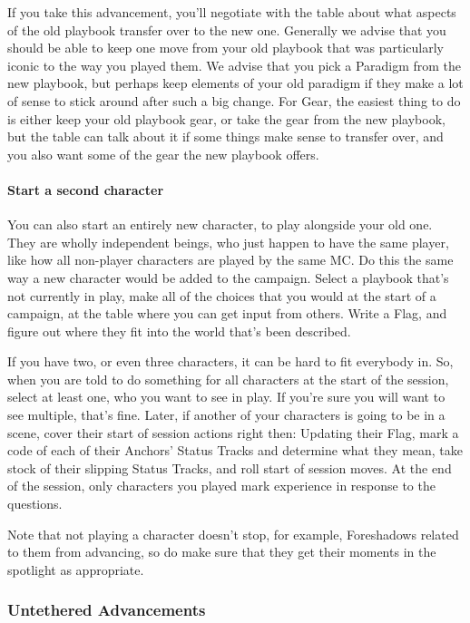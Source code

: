 \documentclass[
]{article}
\begin{document}
If you take this advancement, you'll negotiate with the table about what
aspects of the old playbook transfer over to the new one. Generally we
advise that you should be able to keep one move from your old playbook
that was particularly iconic to the way you played them. We advise that
you pick a Paradigm from the new playbook, but perhaps keep elements of
your old paradigm if they make a lot of sense to stick around after such
a big change. For Gear, the easiest thing to do is either keep your old
playbook gear, or take the gear from the new playbook, but the table can
talk about it if some things make sense to transfer over, and you also
want some of the gear the new playbook offers.

\hypertarget{start-a-second-character}{%
\paragraph{Start a second character}\label{start-a-second-character}}

You can also start an entirely new character, to play alongside your old
one. They are wholly independent beings, who just happen to have the
same player, like how all non-player characters are played by the same
MC. Do this the same way a new character would be added to the campaign.
Select a playbook that's not currently in play, make all of the choices
that you would at the start of a campaign, at the table where you can
get input from others. Write a Flag, and figure out where they fit into
the world that's been described.

If you have two, or even three characters, it can be hard to fit
everybody in. So, when you are told to do something for all characters
at the start of the session, select at least one, who you want to see in
play. If you're sure you will want to see multiple, that's fine. Later,
if another of your characters is going to be in a scene, cover their
start of session actions right then: Updating their Flag, mark a code of
each of their Anchors' Status Tracks and determine what they mean, take
stock of their slipping Status Tracks, and roll start of session moves.
At the end of the session, only characters you played mark experience in
response to the questions.

Note that not playing a character doesn't stop, for example, Foreshadows
related to them from advancing, so do make sure that they get their
moments in the spotlight as appropriate.

\hypertarget{untethered-advancements-1}{%
\subsubsection{Untethered
Advancements}\label{untethered-advancements-1}}
\end{document}
